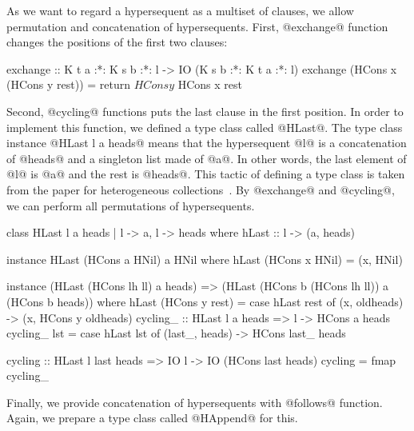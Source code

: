 \documentclass[doctor]{iscs-thesis}
\begin{document}
As we want to regard a hypersequent as a multiset of clauses, we allow
permutation and concatenation of hypersequents.
First, @exchange@ function changes the positions of the first two
clauses:
\begin{code}
exchange :: K t a :*: K s b :*: l ->
            IO (K s b :*: K t a :*: l)
exchange (HCons x (HCons y rest)) =
  return $ HCons y $ HCons x rest
\end{code}
Second, @cycling@ functions puts the last clause in the first position.
In order to implement this function, we defined a type class called
@HLast@.
The type class instance @HLast l a heads@ means that the hypersequent @l@
is a concatenation of @heads@ and a singleton list made of @a@.  In
other words, the last element of @l@ is @a@ and the rest is @heads@.
This tactic of defining a type class is taken from the paper for
heterogeneous collections~\citep{hetero}.
By @exchange@ and @cycling@, we can perform all permutations of
hypersequents.
\begin{code}
class HLast l a heads | l -> a, l -> heads
 where hLast :: l -> (a, heads)

instance HLast (HCons a HNil) a HNil
    where hLast (HCons x HNil) = (x, HNil)

instance (HLast (HCons lh ll) a heads) =>
  (HLast (HCons b (HCons lh ll)) a (HCons b heads))
    where hLast (HCons y rest) =
              case hLast rest of
                (x, oldheads) -> (x, HCons y oldheads)
cycling_ :: HLast l a heads => l -> HCons a heads
cycling_ lst = case hLast lst of
                (last_, heads) -> HCons last_ heads

cycling :: HLast l last heads =>
  IO l -> IO (HCons last heads)
cycling = fmap cycling_
\end{code}
Finally, we provide concatenation of hypersequents with @follows@
function.
Again, we prepare a type class called @HAppend@ for this.
\end{document}

